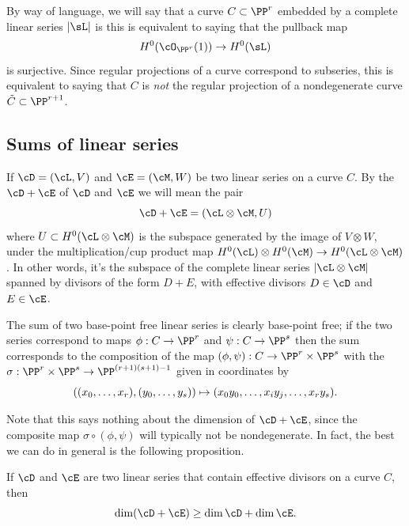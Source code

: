 By way of language, we will say that a curve $C \subset \PP^r$
embedded by a complete linear series $|\sL|$ is 
%
this is equivalent to saying that the pullback map
$$
H^0(\cO_{\PP^r}(1)) \to H^0(\sL)
$$
is surjective. Since regular projections of a curve correspond to subseries, this is equivalent to saying that $C$ is \emph{not} the regular  projection of a nondegenerate curve $\tilde C \subset \PP^{r+1}$. 

\subsection*{Sums of linear series}
If
$\cD = (\cL,V)$ and $\cE = (\cM, W)$ be two linear series on a curve
$C$. By the
%
$\cD + \cE$ of $\cD$ and $\cE$
 we will mean the pair 
$$
\cD + \cE = (\cL \otimes \cM, U) 
$$
where $U \subset H^0(\cL \otimes \cM)$ is the subspace generated by
the image of $V \otimes W$, under the multiplication/cup product map
$H^0(\cL) \otimes H^0(\cM) \to H^0(\cL \otimes \cM)$. In other words,
it's the subspace of the complete linear series $|\cL\otimes \cM|$
spanned by divisors of the form $D+E$, with effective divisors $D \in
\cD$ and $E \in \cE$.
 
The sum of two base-point free linear series is clearly base-point free; if the two series correspond to maps
$\phi:C\to \PP^r$ and $\psi:C\to \PP^s$ then the sum corresponds to the composition of the map
$(\phi, \psi): C\to \PP^r\times \PP^s$ with the 
% 
$\sigma : \PP^r\times \PP^s \to \PP^{(r+1)(s+1)-1}$
given in coordinates by
$$
((x_0,\dots, x_r), (y_0, \dots, y_s))\mapsto (x_0y_0, \dots, x_iy_j, \dots, x_ry_s).
\vspace*{-\parskip}
$$

Note that this says nothing about the dimension of $\cD + \cE$, since the composite map $\sigma \circ (\phi, \psi)$ will typically not be nondegenerate. In fact, the best we can do in general is the following proposition.


\begin{proposition}\label{sum of linear series}
 If $\cD$ and $\cE$ are two  linear series that contain effective divisors on a curve $C$, then
$$
\dim(\cD + \cE) \geq \dim \cD + \dim \cE.
\vspace*{-\parskip}
$$
\end{proposition}

